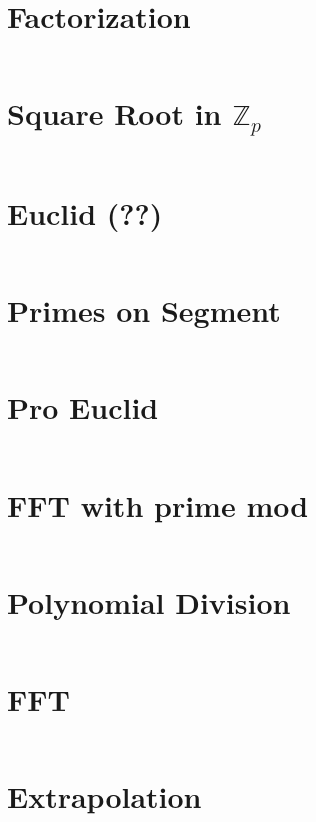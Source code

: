 \documentclass{article}
\begin{document}
\begin{multicols}{2}
\section*{Factorization}
\inputminted[frame=single,breaklines]{cpp}{../factorize.cpp}

\section*{Square Root in $\mathbb{Z}_p$}
\inputminted[frame=single,breaklines]{cpp}{../square_prime_mod.cpp}

\section*{Euclid (??)}
\inputminted[frame=single,breaklines]{cpp}{../euclid.cpp}

\section*{Primes on Segment}
\inputminted[frame=single,breaklines]{cpp}{../cnt_primes_on_segment.cpp}

\section*{Pro Euclid}
\inputminted[frame=single,breaklines]{cpp}{../pro-euclid.cpp}

\section*{FFT with prime mod}
\inputminted[frame=single,breaklines]{cpp}{../fft_with_prime_mod.cpp}

\section*{Polynomial Division}
\inputminted[frame=single,breaklines]{cpp}{../polynom_division.cpp}

\section*{FFT}
\inputminted[frame=single,breaklines]{cpp}{../fft.cpp}

\section*{Extrapolation}
\inputminted[frame=single,breaklines]{cpp}{../extrapolation.cpp}


\end{multicols}
\end{document}
